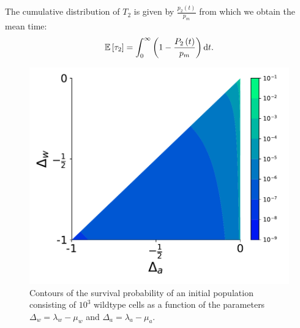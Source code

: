 \documentclass[12pt]{extarticle}
\renewcommand{\d}{{\rm d}}
\begin{document}
The cumulative distribution of $T_2$ is given by $\frac{p_2\left(t\right)}{p_m}$ from which we obtain the mean time:
\begin{align}
\mathbb{E}\left[\tau_2\right]=\int_0^\infty\left(1-\frac{P_2\left(t\right)}{p_m}\right)\d t.
\end{align}
\begin{figure}[!t]
 \vspace*{1\baselineskip}
\includegraphics[width=1\textwidth]{Figures/HeatMap_p_est.pdf}
\caption{Contours of the survival probability of an initial population consisting of $10^{3}$ wildtype cells as a function of the
   parameters $\Delta_w=\lambda_w-\mu_w$ and $\Delta_a=\lambda_a-\mu_a$.}
\label{SurvHeatMapPlot}
\end{figure}
\end{document}
